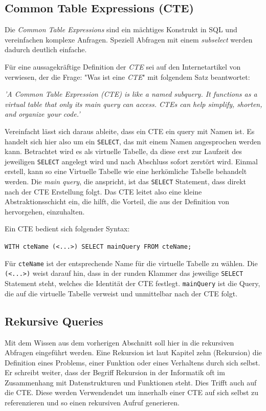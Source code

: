 \subsection{Common Table Expressions (CTE)}
Die \textit{Common Table Expressions} sind ein mächtiges Konstrukt in SQL und
vereinfachen komplexe Anfragen. Speziell Abfragen mit einem \textit{subselect}
werden dadurch deutlich einfache.

Für eine aussagekräftige Definition der \textit{CTE} sei auf den Internetartikel
von \cite{Ignacio2022} verwiesen, der die Frage: "Was ist eine \textit{CTE}" mit
folgendem Satz beantwortet:
\begin{center}
	\textit{ 'A Common Table Expression (CTE) is like a named subquery. It functions
	as a virtual table that only its main query can access. CTEs can help simplify,
	shorten, and organize your code.' } \\ \cite{Ignacio2022}
\end{center}
Vereinfacht lässt sich daraus ableite, dass ein CTE ein query mit Namen ist. Es handelt
sich hier also um ein \texttt{SELECT}, das mit einem Namen angesprochen werden kann.
Betrachtet wird es als virtuelle Tabelle, da diese erst zur Laufzeit des jeweiligen
\texttt{SELECT} angelegt wird und nach Abschluss sofort zerstört wird. Einmal erstell,
kann so eine Virtuelle Tabelle wie eine herkömliche Tabelle behandelt werden. Die
\textit{main query}, die \cite{Ignacio2022} anspricht, ist das \texttt{SELECT} Statement,
dass direkt nach der CTE Erstellung folgt. Das CTE leitet also eine kleine Abstraktionsschicht
ein, die hilft, die Vorteil, die aus der Definition von \cite{Ignacio2022}
hervorgehen, einzuhalten.

Ein CTE bedient sich folgender Syntax:

\texttt{WITH cteName (<...>) SELECT mainQuery FROM cteName;}

Für \texttt{cteName} ist der entsprechende Name für die virtuelle Tabelle zu
wählen. Die \texttt{(<...>)} weist darauf hin, dass in der runden Klammer das jeweilige
\texttt{SELECT} Statement steht, welches die Identität der CTE festlegt. \texttt{mainQuery}
ist die Query, die auf die virtuelle Tabelle verweist und unmittelbar nach der
CTE folgt.

\subsection{Rekursive Queries}
Mit dem Wissen aus dem vorherigen Abschnitt soll hier in die rekursiven Abfragen
eingeführt werden. Eine Rekursion ist laut \cite{benecke1998rekursion} Kapitel zehn
(Rekursion) die Definition eines Problems, einer Funktion oder eines Verhaltens
durch sich selbst. Er schreibt weiter, dass der Begriff Rekursion in der
Informatik oft im Zusammenhang mit Datenstrukturen und Funktionen steht. Dies Trifft
auch auf die CTE. Diese werden Verwendendet um innerhalb einer CTE auf sich
selbst zu referenzieren und so einen rekursiven Aufruf generieren.

